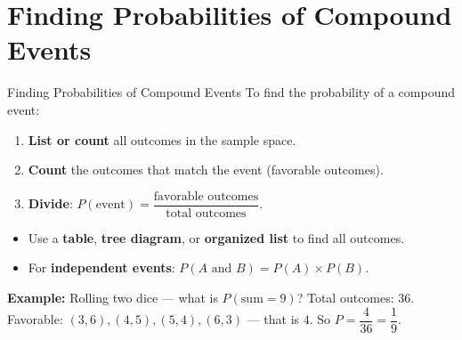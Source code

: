 \section{Finding Probabilities of Compound Events}

\begin{quickReview}{Finding Probabilities of Compound Events}
To find the probability of a compound event:
\begin{enumerate}[leftmargin=*]
    \item \textbf{List or count} all outcomes in the sample space.
    \item \textbf{Count} the outcomes that match the event (favorable outcomes).
    \item \textbf{Divide}: $P(\text{event}) = \dfrac{\text{favorable outcomes}}{\text{total outcomes}}$.
\end{enumerate}

\begin{itemize}[leftmargin=*]
    \item Use a \textbf{table}, \textbf{tree diagram}, or \textbf{organized list} to find all outcomes.
    \item For \textbf{independent events}: $P(A \text{ and } B) = P(A) \times P(B)$.
\end{itemize}

\medskip
\textbf{Example:} Rolling two dice — what is $P(\text{sum} = 9)$? Total outcomes: $36$. Favorable: $(3,6), (4,5), (5,4), (6,3)$ — that is $4$. So $P = \dfrac{4}{36} = \dfrac{1}{9}$.
\end{quickReview}

